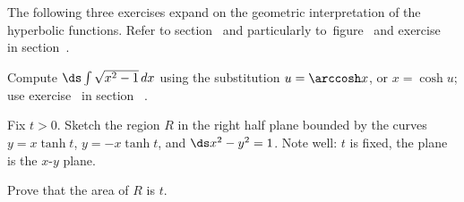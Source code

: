 \begin{exercises}
\iflatetranscendentals
\else
\vskip15pt\noindent
The following three exercises expand on the geometric interpretation
of the hyperbolic functions. Refer to section~
and particularly to~figure~ and 
exercise~
in section~.

\exercise
Compute $\ds \int \sqrt{x^2 -1}\,dx $ using the substitution
$u=\arccosh x$, or $x=\cosh u$; 
use exercise~
in section ~.

\exercise  Fix $t>0$.
  Sketch the region $R$ in the right half plane bounded by the curves 
$y=x\tanh t$, $y=-x\tanh t$,  and $\ds x^2-y^2 =1$. Note well: $t$ is fixed,
the plane is the $x$-$y$ plane.

\exercise Prove that the area of $R$ is $t$.
\fi

\end{exercises}

